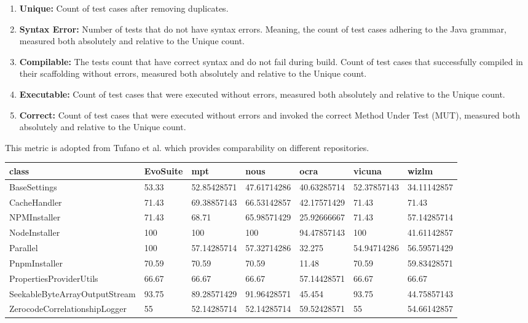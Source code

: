     \begin{enumerate}
        \item \textbf{Unique:} Count of test cases after removing duplicates.
        \item \textbf{Syntax Error:} Number of tests that do not have syntax errors. Meaning, the count of test cases adhering to the Java grammar, measured both absolutely and relative to the Unique count.
        \item \textbf{Compilable:} The tests count that have correct syntax and do not fail during build. Count of test cases that successfully compiled in their scaffolding without errors, measured both absolutely and relative to the Unique count.
        \item \textbf{Executable:} Count of test cases that were executed without errors, measured both absolutely and relative to the Unique count.
        \item \textbf{Correct:} Count of test cases that were executed without errors and invoked the correct Method Under Test (MUT), measured both absolutely and relative to the Unique count. 
    \end{enumerate}
    This metric is adopted from Tufano et al. \cite{tufano_unit_2021} which provides comparability on different repositories.

\begin{table}
\centering

\begin{tabular}{| l | l | l | l | l | l | l |}
\hline
\textbf{class} & \textbf{EvoSuite} & \textbf{mpt} & \textbf{nous} & \textbf{ocra} & \textbf{vicuna} & \textbf{wizlm} \\
\hline
BaseSettings & 53.33 & 52.85428571 & 47.61714286 & 40.63285714 & 52.37857143 & 34.11142857 \\
\hline
CacheHandler & 71.43 & 69.38857143 & 66.53142857 & 42.17571429 & 71.43 & 71.43 \\
\hline
NPMInstaller & 71.43 & 68.71 & 65.98571429 & 25.92666667 & 71.43 & 57.14285714 \\
\hline
NodeInstaller & 100 & 100 & 100 & 94.47857143 & 100 & 41.61142857 \\
\hline
Parallel & 100 & 57.14285714 & 57.32714286 & 32.275 & 54.94714286 & 56.59571429 \\
\hline
PnpmInstaller & 70.59 & 70.59 & 70.59 & 11.48 & 70.59 & 59.83428571 \\
\hline
PropertiesProviderUtils & 66.67 & 66.67 & 66.67 & 57.14428571 & 66.67 & 66.67 \\
\hline
SeekableByteArrayOutputStream & 93.75 & 89.28571429 & 91.96428571 & 45.454 & 93.75 & 44.75857143 \\
\hline
ZerocodeCorrelationshipLogger & 55 & 52.14285714 & 52.14285714 & 59.52428571 & 55 & 54.66142857 \\
\hline

\end{tabular}

\end{table}


